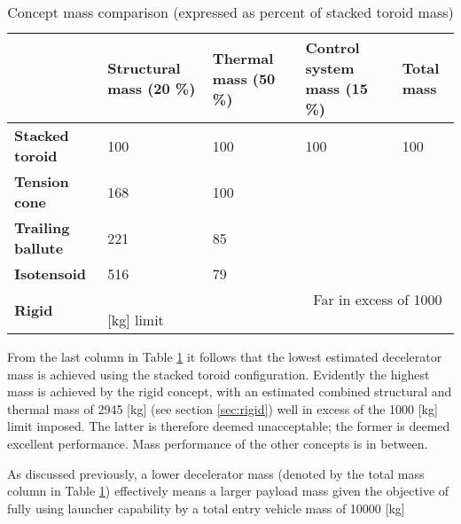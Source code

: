 \begin{table}[h]

\caption{Concept mass comparison (expressed as percent of stacked toroid mass)}\label{tab:cmass}
\hspace{-10mm}
\begin{tabular}{|p{}|p{}|p{}|p{}||p{}|}

\hline
                          & \textbf{Structural mass (20 \%)} & \textbf{Thermal mass (50 \%)} & \textbf{Control system mass (15 \%)} & \textbf{Total mass} \\ \hline
\textbf{Stacked toroid}   &  100                                 & 100                          & 100                                      &\cellcolor{green!70}  100                           \\ \hline
\textbf{Tension cone}     &  168                               & 100                               &                                       &\cellcolor{green!70}                                \\ \hline
\textbf{Trailing ballute} &  221                                 & 85                               &                                       &\cellcolor{green!70}                                \\ \hline
\textbf{Isotensoid}       &  516                                 & 79                               &                                       &\cellcolor{yellow!75}                             \\ \hline \hline
\textbf{Rigid}            &  \multicolumn{4}{|p{0.762\textwidth}|}{\cellcolor{red!60} ~~~~~~~~~~~~~~~~~~~~~~~~~~~~~Far in excess of 1000 [kg] limit}    \\ \hline
\end{tabular}
\end{table}

From the last column in Table \ref{tab:cmass} it follows that the lowest estimated decelerator mass is achieved using the stacked toroid configuration. Evidently the highest mass is achieved by the rigid concept, with an estimated combined structural and thermal mass of 2945 [kg] (see section \ref{sec:rigid}) well in excess of the 1000 [kg] limit imposed. The latter is therefore deemed unacceptable; the former is deemed excellent performance. Mass performance of the other concepts is in between. 

As discussed previously, a lower decelerator mass (denoted by the total mass column in Table \ref{tab:cmass}) effectively means a larger payload mass given the objective of fully using launcher capability by a total entry vehicle mass of 10000 [kg]

